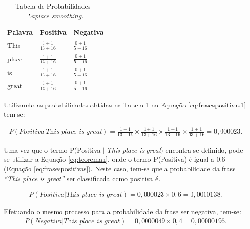 \begin{table}[htb]
\centering
\renewcommand{\arraystretch}{1.5}%
\begin{tabular}{lll}
\hline

Palavra & Positiva & Negativa \\ \hline
This & \large $\frac{1 + 1}{13 + 16}$ & \large $\frac{0 + 1}{5 + 16}$ \\
place & \large $\frac{1 + 1}{13 + 16}$ & \large $\frac{0 + 1}{5 + 16}$ \\
is & \large $\frac{1 + 1}{13 + 16}$ & \large $\frac{0 + 1}{5 + 16}$ \\
great & \large $\frac{1 + 1}{13 + 16}$ & \large $\frac{0 + 1}{5 + 16}$ \\
\end{tabular}
\caption{Tabela de Probabilidades - \textit{Laplace smoothing}.}
\label{tab:probabilidadesl}
\end{table}

Utilizando as probabilidades obtidas na Tabela
\ref{tab:probabilidadesl} na Equação \ref{eq:frasespositivas1} tem-se:

\begin{equation}
\begin{gathered}
P(Positiva|\textit{This place is great}) = \frac{1 + 1}{13 + 16} \times
\frac{1 + 1}{13 + 16} \times \frac{1 + 1}{13 + 16} \times
\frac{1 + 1}{13 + 16} = 0,000023.
\label{eq:ppositivaplace}
\end{gathered}
\end{equation}

Uma vez que o termo P(Positiva $\vert$ \textit{This place is great})
encontra-se definido, pode-se
utilizar a Equação \ref{eq:teoreman}, onde o termo P(Positiva) é igual a 0,6
(Equação \ref{eq:frasespositivas}). Neste caso, tem-se que a probabilidade da
frase \textit{``This place is great''} ser classificada como positiva é.

\begin{equation}
\begin{gathered}
P(Positiva|\textit{This place is great})
=
0,000023 \times
0,6 = 0,0000138.
\label{eq:positiva}
\end{gathered}
\end{equation}

Efetuando o mesmo processo para a probabilidade da frase ser negativa, tem-se:
\begin{equation}
\begin{gathered}
P(Negativa|\textit{This place is great})
=
0,0000049 \times
0,4 = 0,00000196.
\label{eq:negativa}
\end{gathered}
\end{equation}

